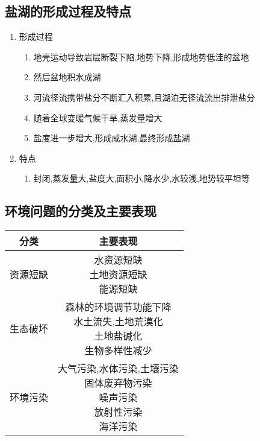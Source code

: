 \documentclass[a4paper]{article}
\begin{document}
    \subsection{盐湖的形成过程及特点}
    \begin{enumerate}
        \item 形成过程
        \begin{enumerate}
            \item 地壳运动导致岩层断裂下陷,地势下降,形成地势低洼的盆地
            \item 然后盆地积水成湖
            \item 河流径流携带盐分不断汇入积累,且湖泊无径流流出排泄盐分
            \item 随着全球变暖气候干旱,蒸发量增大
            \item 盐度进一步增大,形成咸水湖,最终形成盐湖
        \end{enumerate}
        \item 特点
        \begin{enumerate}
            \item 封闭,蒸发量大,盐度大,面积小,降水少,水较浅,地势较平坦等
        \end{enumerate}
    \end{enumerate}
    \subsection{环境问题的分类及主要表现}
        \begin{tabular}{|c|c|}
            \hline
            分类    &   主要表现    \\
            \hline
            资源短缺    &   \makecell[c]{水资源短缺\\土地资源短缺\\能源短缺}  \\
            \hline
            生态破坏    &   \makecell[c]{森林的环境调节功能下降\\水土流失,土地荒漠化\\土地盐碱化\\生物多样性减少}   \\
            \hline
            环境污染    &   \makecell[c]{大气污染,水体污染,土壤污染\\固体废弃物污染\\噪声污染\\放射性污染\\海洋污染}  \\
            \hline
        \end{tabular}
\end{document}
